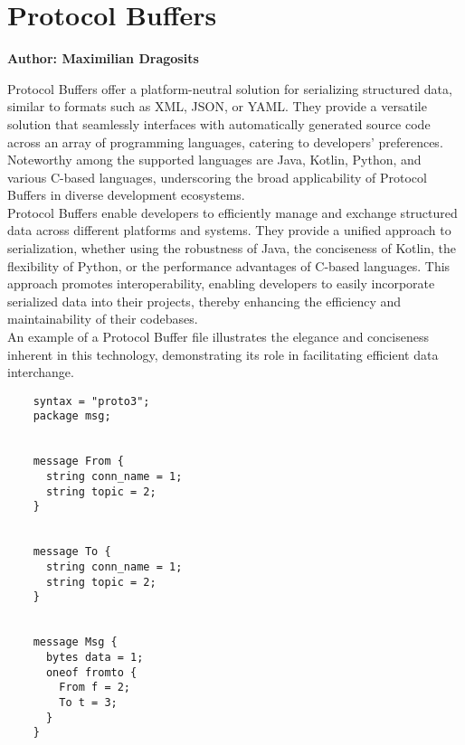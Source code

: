 \section{Protocol Buffers}
\textbf{Author: Maximilian Dragosits}

Protocol Buffers offer a platform-neutral solution for serializing structured data, similar to formats such as XML, JSON, or YAML. They provide a versatile 
solution that seamlessly interfaces with automatically generated source code across an array of programming languages, catering to developers' preferences. 
Noteworthy among the supported languages are Java, Kotlin, Python, and various C-based languages, underscoring the broad applicability of Protocol Buffers 
in diverse development ecosystems.\\

Protocol Buffers enable developers to efficiently manage and exchange structured data across different platforms and systems. They provide a unified approach 
to serialization, whether using the robustness of Java, the conciseness of Kotlin, the flexibility of Python, or the performance advantages of C-based languages. 
This approach promotes interoperability, enabling developers to easily incorporate serialized data into their projects, thereby enhancing the efficiency and 
maintainability of their codebases.\\

An example of a Protocol Buffer file illustrates the elegance and conciseness inherent in this technology, demonstrating its role in facilitating efficient 
data interchange.

\begin{verbatim}
    syntax = "proto3";
    package msg;
    
    
    message From {
      string conn_name = 1;
      string topic = 2;
    }
    
    
    message To {
      string conn_name = 1;
      string topic = 2;
    }
    
    
    message Msg {
      bytes data = 1;
      oneof fromto {
        From f = 2;
        To t = 3;
      }
    }
\end{verbatim}

